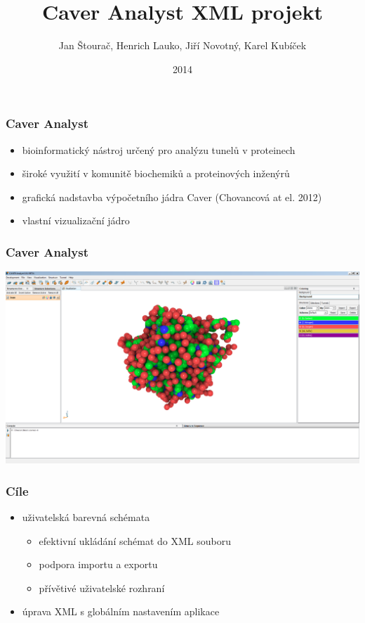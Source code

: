 \documentclass[slovak]{beamer}
\title{Caver Analyst XML projekt}
\date{2014}
\author{
	Jan Štourač, Henrich Lauko, Jiří Novotný, Karel Kubíček
}
\begin{document}
\begin{frame}
	\titlepage
\end{frame}

\begin{frame}
\frametitle{Caver Analyst}
	\begin{itemize}
		\item bioinformatický nástroj určený pro analýzu tunelů v proteinech
		\item široké využití v komunitě biochemiků a proteinových inženýrů
		\item grafická nadstavba výpočetního jádra Caver (Chovancová at el. 2012)
		\item vlastní vizualizační jádro
	\end{itemize}
\end{frame}

\begin{frame}
\frametitle{Caver Analyst}
	\begin{center}
		\includegraphics[width=\linewidth]{caver.png}
	\end{center}
\end{frame}

\begin{frame}
\frametitle{Cíle}
	\begin{itemize}
		\item uživatelská barevná schémata
		\begin{itemize}
			\item efektivní ukládání schémat do XML souboru
			\item podpora importu a exportu
			\item přívětivé uživatelské rozhraní
		\end{itemize}
		\item úprava XML s globálním nastavením aplikace
	\end{itemize}
\end{frame}
\end{document}
